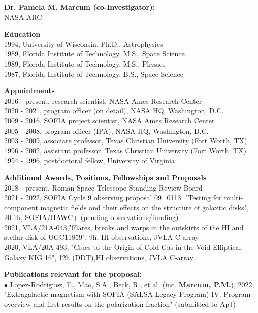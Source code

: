 \textbf{\color{Blue}\large Dr. Pamela M. Marcum (co-Investigator):}\\
NASA ARC
\par \vspace{-0.5em}
\textbf{Education}\\
1994, University of Wisconsin, Ph.D., Astrophysics\\
1989, Florida Institute of Technology, M.S., Space Science\\
1989, Florida Institute of Technology, M.S., Physics\\
1987, Florida Institute of Technology, B.S., Space Science
\par \vspace{-0.5em}
\textbf{Appointments}\\
2016 - present, research scientist, NASA Ames Research Center\\
2020 - 2021, program officer (on detail), NASA HQ, Washington, D.C.\\
2009 - 2016, SOFIA project scientist, NASA Ames Research Center\\
2005 - 2008, program officer (IPA), NASA HQ, Washington, D.C.\\
2003 - 2009, associate professor, Texas Christian University (Fort Worth, TX)\\
1996 - 2002, assistant professor, Texas Christian University (Fort Worth, TX)\\
1994 - 1996, postdoctoral fellow, University of Virginia
\par \vspace{-0.5em}
\textbf{Additional Awards, Positions, Fellowships and Proposals}\\
2018 - present, Roman Space Telescope Standing Review Board\\
2021 - 2022, SOFIA Cycle 9 observing proposal 09\_0113: "Testing for multi-component magnetic fields and their effects on the structure of galaxtic disks", 20.1h, SOFIA/HAWC+ (pending observations/funding)\\
2021, VLA/21A-043,"Flares, breaks and warps in the outskirts of the HI and stellar disk of UGC11859", 9h, HI observations, JVLA C-array\\
2020, VLA/20A-493, "Clues to the Origin of Cold Gas in the Void Elliptical Galaxy KIG 16", 12h (DDT),HI observations, JVLA C-array
\par \vspace{-0.5em}
\textbf{Publications relevant for the proposal:}\\
{\scriptsize{$\bullet$}} Lopez-Rodriguez, E., Mao, S.A., Beck, R., et al. (inc. \textbf{Marcum, P.M.}), 2022, "Extragalactic magnetism with SOFIA (SALSA Legacy Program) IV: Program overview and first results on the polarization fraction" (submitted to ApJ)\\
